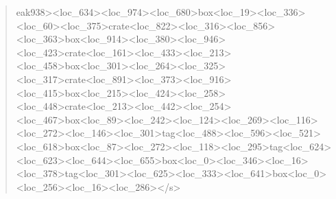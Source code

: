 \documentclass[10pt,a4paper]{article}
\begin{document}
\begin{quote}
eak{}938>\allowbreak{}<loc\_634>\allowbreak{}<loc\_974>\allowbreak{}<loc\_680>\allowbreak{}b\allowbreak{}ox<loc\_19>\allowbreak{}<loc\_336>\allowbreak{}<loc\_60>\allowbreak{}<loc\_\allowbreak{}375>\allowbreak{}crate<loc\_822>\allowbreak{}<loc\_316>\allowbreak{}<loc\_\allowbreak{}856>\allowbreak{}<loc\_363>\allowbreak{}box<loc\_914>\allowbreak{}<loc\_38\allowbreak{}0>\allowbreak{}<loc\_946>\allowbreak{}<loc\_423>\allowbreak{}crate<loc\_16\allowbreak{}1>\allowbreak{}<loc\_433>\allowbreak{}<loc\_213>\allowbreak{}<loc\_458>\allowbreak{}box\allowbreak{}<loc\_301>\allowbreak{}<loc\_264>\allowbreak{}<loc\_325>\allowbreak{}<loc\_\allowbreak{}317>\allowbreak{}crate<loc\_891>\allowbreak{}<loc\_373>\allowbreak{}<loc\_\allowbreak{}916>\allowbreak{}<loc\_415>\allowbreak{}box<loc\_215>\allowbreak{}<loc\_42\allowbreak{}4>\allowbreak{}<loc\_258>\allowbreak{}<loc\_448>\allowbreak{}crate<loc\_21\allowbreak{}3>\allowbreak{}<loc\_442>\allowbreak{}<loc\_254>\allowbreak{}<loc\_467>\allowbreak{}box\allowbreak{}<loc\_89>\allowbreak{}<loc\_242>\allowbreak{}<loc\_124>\allowbreak{}<loc\_2\allowbreak{}69>\allowbreak{}<loc\_116>\allowbreak{}<loc\_272>\allowbreak{}<loc\_146>\allowbreak{}<l\allowbreak{}oc\_301>\allowbreak{}tag<loc\_488>\allowbreak{}<loc\_596>\allowbreak{}<loc\allowbreak{}\_521>\allowbreak{}<loc\_618>\allowbreak{}box<loc\_87>\allowbreak{}<loc\_27\allowbreak{}2>\allowbreak{}<loc\_118>\allowbreak{}<loc\_295>\allowbreak{}tag<loc\_624>\allowbreak{}\allowbreak{}<loc\_623>\allowbreak{}<loc\_644>\allowbreak{}<loc\_655>\allowbreak{}box<l\allowbreak{}oc\_0>\allowbreak{}<loc\_346>\allowbreak{}<loc\_16>\allowbreak{}<loc\_378>\allowbreak{}t\allowbreak{}ag<loc\_301>\allowbreak{}<loc\_625>\allowbreak{}<loc\_333>\allowbreak{}<lo\allowbreak{}c\_641>\allowbreak{}box<loc\_0>\allowbreak{}<loc\_256>\allowbreak{}<loc\_16\allowbreak{}>\allowbreak{}<loc\_286>\allowbreak{}</s>\allowbreak{}
\end{quote}
\end{document}
